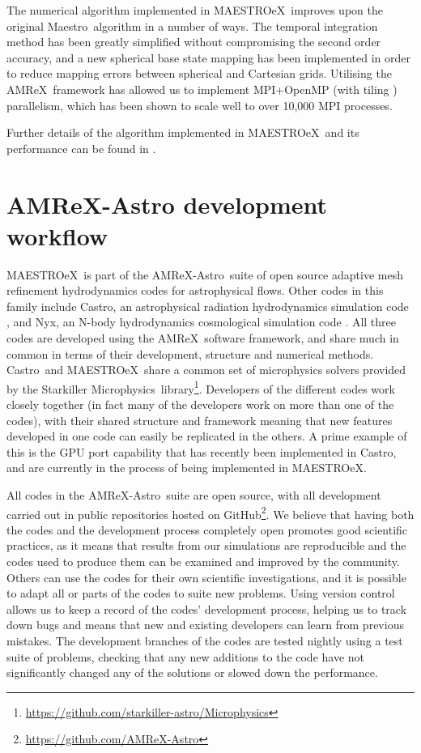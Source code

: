\documentclass[a4paper]{jpconf}
\newcommand{\maestro}{{\sffamily Maestro}}
\newcommand{\maestroex}{{\sffamily MAESTROeX}}
\newcommand{\castro}{{\sffamily Castro}}
\newcommand{\nyx}{{\sffamily Nyx}}
\newcommand{\amrex}{{\sffamily AMReX}}
\newcommand{\starkiller}{{\sffamily Starkiller Microphysics}}
\newcommand{\amrexastro}{{\sffamily AMReX-Astro}}
\newcommand{\MarginPar}[1]{\marginpar{\vskip-\baselineskip\raggedright\tiny\sffamily\hrule\smallskip{\color{red}#1}\par\smallskip\hrule}}
\begin{document}
The numerical algorithm implemented in \maestroex~improves upon the original \maestro~algorithm in a number of ways. The temporal integration method has been greatly simplified without compromising the second order accuracy, and a new spherical base state mapping has been implemented in order to reduce mapping errors between spherical and Cartesian grids. Utilising the \amrex~framework has allowed us to implement MPI+OpenMP (with tiling \cite{Zhang2016}) parallelism, which has been shown to scale well to over 10,000 MPI processes. 

Further details of the algorithm implemented in \maestroex~and its performance can be found in \cite{Fan2019}.



\section{AMReX-Astro development workflow} \label{sec:workflow}


\maestroex~is part of the \amrexastro~suite of open source adaptive mesh refinement hydrodynamics codes for astrophysical flows. Other codes in this family include \castro, an astrophysical radiation hydrodynamics simulation code \cite{Almgren2010}, and \nyx, an N-body hydrodynamics cosmological simulation code \cite{Almgren2013}. All three codes are developed using the \amrex~software framework, and share much in common in terms of their development, structure and numerical methods. \castro~and \maestroex~share a common set of microphysics solvers provided by the \starkiller~library\footnote{\url{https://github.com/starkiller-astro/Microphysics}}. Developers of the different codes work closely together (in fact many of the developers work on more than one of the codes), with their shared structure and framework meaning that new features developed in one code can easily be replicated in the others. A prime example of this is the GPU port capability that has recently been implemented in \castro, and are currently in the process of being implemented in \maestroex. 

All codes in the \amrexastro~suite are open source, with all development carried out in public repositories hosted on GitHub\footnote{\url{https://github.com/AMReX-Astro}}. We believe that having both the codes and the development process completely open promotes good scientific practices, as it means that results from our simulations are reproducible and the codes used to produce them can be examined and improved by the community.  Others can use the codes for their own scientific investigations, and it is possible to adapt all or parts of the codes to suite new problems. Using version control allows us to keep a record of the codes' development process, helping us to track down bugs and means that new and existing developers can learn from previous mistakes. The development branches of the codes are tested nightly using a test suite of problems, checking that any new additions to the code have not significantly changed any of the solutions or slowed down the performance.
\end{document}
